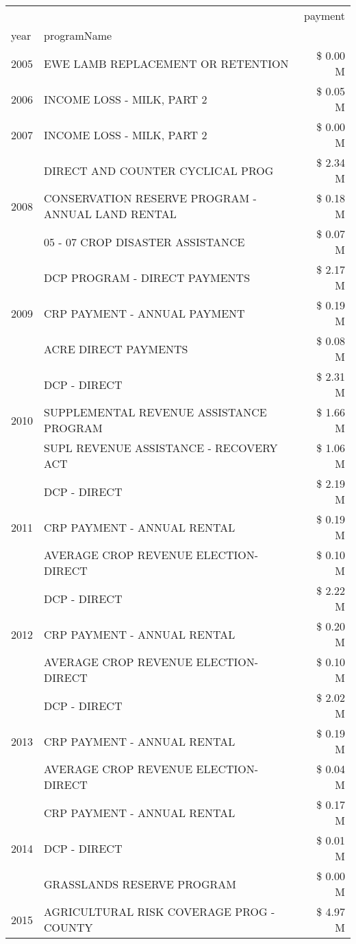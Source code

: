 \begin{tabular}{llr}
\toprule
 &  & payment \\
year & programName &  \\
\midrule
2005 & EWE LAMB REPLACEMENT OR RETENTION & \$ 0.00 M \\
\cline{1-3}
2006 & INCOME LOSS - MILK, PART 2 & \$ 0.05 M \\
\cline{1-3}
2007 & INCOME LOSS - MILK, PART 2 & \$ 0.00 M \\
\cline{1-3}
\multirow[t]{3}{*}{2008} & DIRECT AND COUNTER CYCLICAL PROG & \$ 2.34 M \\
 & CONSERVATION RESERVE PROGRAM - ANNUAL LAND RENTAL & \$ 0.18 M \\
 & 05 - 07 CROP DISASTER ASSISTANCE & \$ 0.07 M \\
\cline{1-3}
\multirow[t]{3}{*}{2009} & DCP PROGRAM - DIRECT PAYMENTS & \$ 2.17 M \\
 & CRP PAYMENT - ANNUAL PAYMENT & \$ 0.19 M \\
 & ACRE DIRECT PAYMENTS & \$ 0.08 M \\
\cline{1-3}
\multirow[t]{3}{*}{2010} & DCP - DIRECT & \$ 2.31 M \\
 & SUPPLEMENTAL REVENUE ASSISTANCE PROGRAM & \$ 1.66 M \\
 & SUPL REVENUE ASSISTANCE - RECOVERY ACT & \$ 1.06 M \\
\cline{1-3}
\multirow[t]{3}{*}{2011} & DCP - DIRECT & \$ 2.19 M \\
 & CRP PAYMENT - ANNUAL RENTAL & \$ 0.19 M \\
 & AVERAGE CROP REVENUE ELECTION-DIRECT & \$ 0.10 M \\
\cline{1-3}
\multirow[t]{3}{*}{2012} & DCP - DIRECT & \$ 2.22 M \\
 & CRP PAYMENT - ANNUAL RENTAL & \$ 0.20 M \\
 & AVERAGE CROP REVENUE ELECTION-DIRECT & \$ 0.10 M \\
\cline{1-3}
\multirow[t]{3}{*}{2013} & DCP - DIRECT & \$ 2.02 M \\
 & CRP PAYMENT - ANNUAL RENTAL & \$ 0.19 M \\
 & AVERAGE CROP REVENUE ELECTION-DIRECT & \$ 0.04 M \\
\cline{1-3}
\multirow[t]{3}{*}{2014} & CRP PAYMENT - ANNUAL RENTAL & \$ 0.17 M \\
 & DCP - DIRECT & \$ 0.01 M \\
 & GRASSLANDS RESERVE PROGRAM & \$ 0.00 M \\
\cline{1-3}
\multirow[t]{3}{*}{2015} & AGRICULTURAL RISK COVERAGE PROG - COUNTY & \$ 4.97 M \\

\end{tabular}
